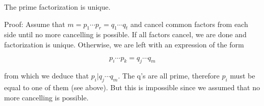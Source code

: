 The prime factorization is unique.

Proof: Assume that \(m = p_1 \cdots p_r = q_1 \cdots q_t\) and cancel
common factors from each side until no more cancelling is possible. If
all factors cancel, we are done and factorization is unique. Otherwise,
we are left with an expression of the form

\[
p_i \cdots p_k = q_j \cdots q_m
\]

from which we deduce that \(p_i | q_j \cdots q_m\). The q's are all
prime, therefore \(p_i\) must be equal to one of them (see above). But
this is impossible since we assumed that no more cancelling is possible.
